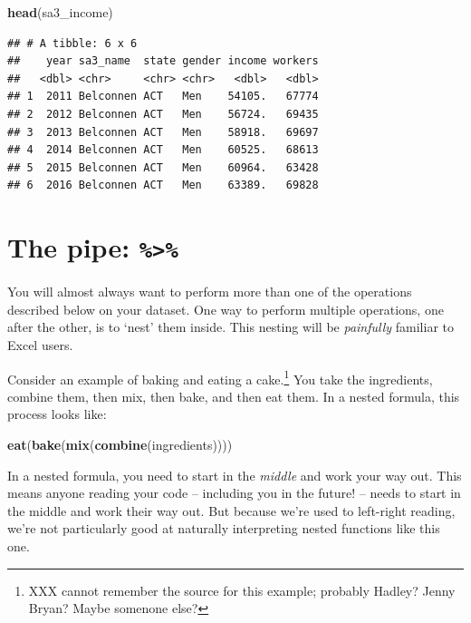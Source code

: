 \documentclass[]{book}
\newenvironment{Shaded}{\begin{snugshade}}{\end{snugshade}}
\newcommand{\KeywordTok}[1]{\textcolor[rgb]{0.13,0.29,0.53}{\textbf{#1}}}
\newcommand{\NormalTok}[1]{#1}
\begin{document}
\begin{Shaded}
\begin{Highlighting}[]
\KeywordTok{head}\NormalTok{(sa3_income)}
\end{Highlighting}
\end{Shaded}

\begin{verbatim}
## # A tibble: 6 x 6
##    year sa3_name  state gender income workers
##   <dbl> <chr>     <chr> <chr>   <dbl>   <dbl>
## 1  2011 Belconnen ACT   Men    54105.   67774
## 2  2012 Belconnen ACT   Men    56724.   69435
## 3  2013 Belconnen ACT   Men    58918.   69697
## 4  2014 Belconnen ACT   Men    60525.   68613
## 5  2015 Belconnen ACT   Men    60964.   63428
## 6  2016 Belconnen ACT   Men    63389.   69828
\end{verbatim}

\hypertarget{the-pipe}{%
\section{\texorpdfstring{The pipe: \texttt{\%\textgreater{}\%}}{The pipe: \%\textgreater{}\%}}\label{the-pipe}}

You will almost always want to perform more than one of the operations described below on your dataset. One way to perform multiple operations, one after the other, is to `nest' them inside. This nesting will be \emph{painfully} familiar to Excel users.

Consider an example of baking and eating a cake.\footnote{XXX cannot remember the source for this example; probably Hadley? Jenny Bryan? Maybe somenone else?} You take the ingredients, combine them, then mix, then bake, and then eat them. In a nested formula, this process looks like:

\begin{Shaded}
\begin{Highlighting}[]
\KeywordTok{eat}\NormalTok{(}\KeywordTok{bake}\NormalTok{(}\KeywordTok{mix}\NormalTok{(}\KeywordTok{combine}\NormalTok{(ingredients))))}
\end{Highlighting}
\end{Shaded}

In a nested formula, you need to start in the \emph{middle} and work your way out. This means anyone reading your code -- including you in the future! -- needs to start in the middle and work their way out. But because we're used to left-right reading, we're not particularly good at naturally interpreting nested functions like this one.
\end{document}
